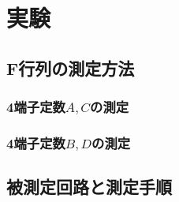 
\section{実験}
\subsection{F行列の測定方法}
\subsubsection{4端子定数$A,C$の測定}

\subsubsection{4端子定数$B,D$の測定}


\subsection{被測定回路と測定手順}